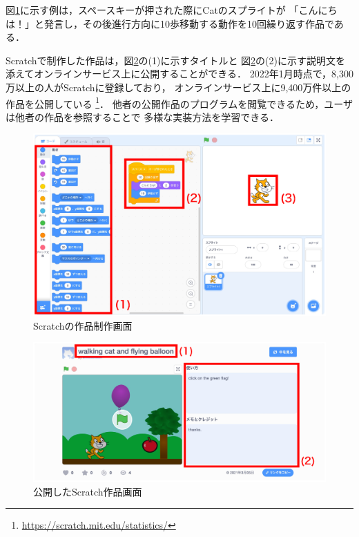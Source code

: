 \documentclass[11pt]{jreport}
\begin{document}
図\ref{scratchdisplay}に示す例は，スペースキーが押された際にCatのスプライトが
「こんにちは！」と発言し，その後進行方向に10歩移動する動作を10回繰り返す作品である．

Scratchで制作した作品は，図\ref{scratchonline}の(1)に示すタイトルと
図\ref{scratchonline}の(2)に示す説明文を添えてオンラインサービス上に公開することができる．
2022年1月時点で，8,300万以上の人がScratchに登録しており，
オンラインサービス上に9,400万件以上の作品を公開している
\footnote{\url{https://scratch.mit.edu/statistics/}}．
他者の公開作品のプログラムを閲覧できるため，ユーザは他者の作品を参照することで
多様な実装方法を学習できる\cite{spfa}．

\begin{figure}[H]
    \centering
    \includegraphics[width=12cm]{scratch_display.eps}
    \caption{Scratchの作品制作画面}
    \label{scratchdisplay}
\end{figure}

\begin{figure}[H]
    \centering
    \includegraphics[width=15cm]{scratch_online.eps}
    \caption{公開したScratch作品画面}
    \label{scratchonline}
\end{figure}
\end{document}
